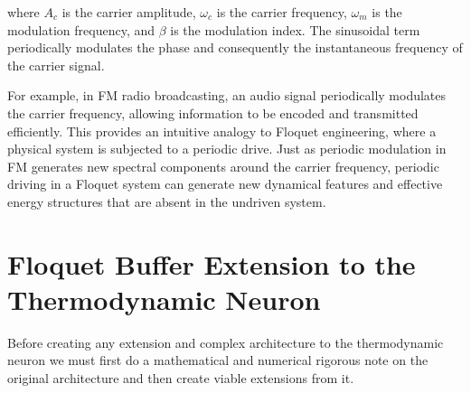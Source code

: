 \documentclass[11pt,a4paper]{article}
\theoremstyle{definition}
\theoremstyle{remark}
\begin{document}
where \(A_c\) is the carrier amplitude, \(\omega_c\) is the carrier frequency, \(\omega_m\) is the modulation frequency, and \(\beta\) is the modulation index. The sinusoidal term periodically modulates the phase and consequently the instantaneous frequency of the carrier signal.

For example, in FM radio broadcasting, an audio signal periodically modulates the carrier frequency, allowing information to be encoded and transmitted efficiently. This provides an intuitive analogy to Floquet engineering, where a physical system is subjected to a periodic drive. Just as periodic modulation in FM generates new spectral components around the carrier frequency, periodic driving in a Floquet system can generate new dynamical features and effective energy structures that are absent in the undriven system.

\section{Floquet Buffer Extension to the Thermodynamic Neuron}
Before creating any extension and complex architecture to the thermodynamic neuron we must first do a mathematical and numerical rigorous note on the original architecture and then create viable extensions from it.
\end{document}
